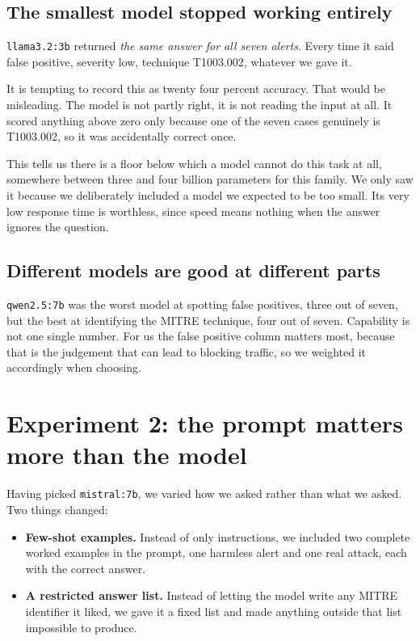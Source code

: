 \documentclass[11pt,a4paper]{article}
\begin{document}
\subsection{The smallest model stopped working entirely}

\texttt{llama3.2:3b} returned \emph{the same answer for all seven alerts}. Every time
it said false positive, severity low, technique T1003.002, whatever we gave it.

It is tempting to record this as twenty four percent accuracy. That would be
misleading. The model is not partly right, it is not reading the input at all. It
scored anything above zero only because one of the seven cases genuinely is
T1003.002, so it was accidentally correct once.

This tells us there is a floor below which a model cannot do this task at all,
somewhere between three and four billion parameters for this family. We only saw it
because we deliberately included a model we expected to be too small. Its very low
response time is worthless, since speed means nothing when the answer ignores the
question.

\subsection{Different models are good at different parts}

\texttt{qwen2.5:7b} was the worst model at spotting false positives, three out of
seven, but the best at identifying the MITRE technique, four out of seven. Capability
is not one single number. For us the false positive column matters most, because that
is the judgement that can lead to blocking traffic, so we weighted it accordingly
when choosing.

\section{Experiment 2: the prompt matters more than the model}

Having picked \texttt{mistral:7b}, we varied how we asked rather than what we asked.
Two things changed:

\begin{itemize}[nosep]
  \item \textbf{Few-shot examples.} Instead of only instructions, we included two
        complete worked examples in the prompt, one harmless alert and one real
        attack, each with the correct answer.
  \item \textbf{A restricted answer list.} Instead of letting the model write any
        MITRE identifier it liked, we gave it a fixed list and made anything outside
        that list impossible to produce.
\end{itemize}
\end{document}
